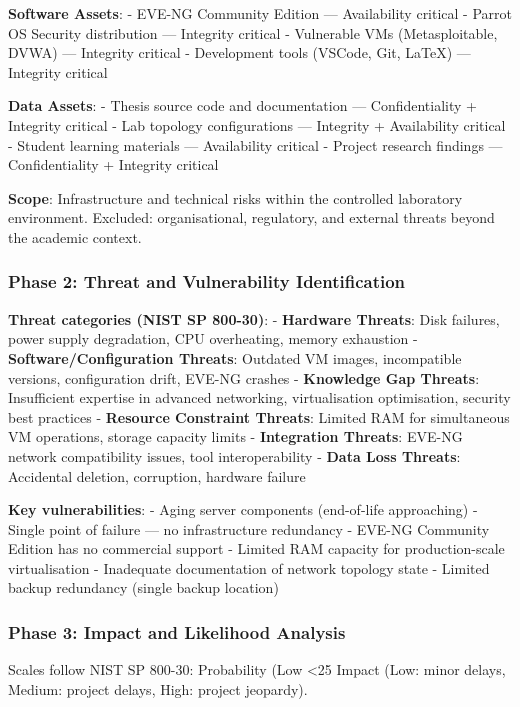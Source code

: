 \textbf{Software Assets}: - EVE-NG Community Edition --- Availability critical - Parrot OS Security distribution --- Integrity critical - Vulnerable VMs (Metasploitable, DVWA) --- Integrity critical - Development tools (VSCode, Git, LaTeX) --- Integrity critical

\textbf{Data Assets}: - Thesis source code and documentation --- Confidentiality + Integrity critical - Lab topology configurations --- Integrity + Availability critical - Student learning materials --- Availability critical - Project research findings --- Confidentiality + Integrity critical

\textbf{Scope}: Infrastructure and technical risks within the controlled laboratory environment. Excluded: organisational, regulatory, and external threats beyond the academic context.

\subsubsection{Phase 2: Threat and Vulnerability Identification}

\textbf{Threat categories (NIST SP 800-30)}: - \textbf{Hardware Threats}: Disk failures, power supply degradation, CPU overheating, memory exhaustion - \textbf{Software/Configuration Threats}: Outdated VM images, incompatible versions, configuration drift, EVE-NG crashes - \textbf{Knowledge Gap Threats}: Insufficient expertise in advanced networking, virtualisation optimisation, security best practices - \textbf{Resource Constraint Threats}: Limited RAM for simultaneous VM operations, storage capacity limits - \textbf{Integration Threats}: EVE-NG network compatibility issues, tool interoperability - \textbf{Data Loss Threats}: Accidental deletion, corruption, hardware failure

\textbf{Key vulnerabilities}: - Aging server components (end-of-life approaching) - Single point of failure --- no infrastructure redundancy - EVE-NG Community Edition has no commercial support - Limited RAM capacity for production-scale virtualisation - Inadequate documentation of network topology state - Limited backup redundancy (single backup location)

\subsubsection{Phase 3: Impact and Likelihood Analysis}

Scales follow NIST SP 800-30: Probability (Low \textless25 Impact (Low: minor delays, Medium: project delays, High: project jeopardy).

